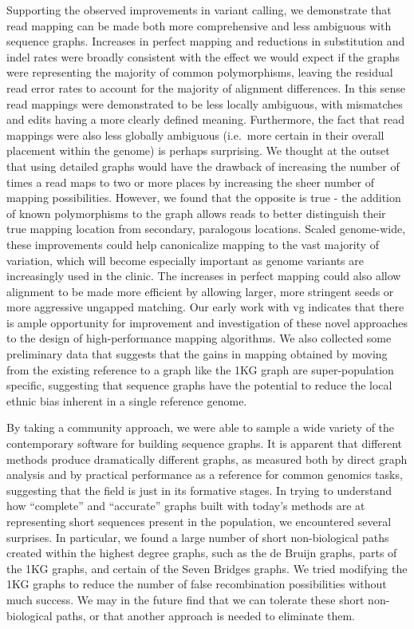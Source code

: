 Supporting the observed improvements in variant calling, we demonstrate
that read mapping can be made both more comprehensive and less ambiguous
with sequence graphs. Increases in perfect mapping and reductions in
substitution and indel rates were broadly consistent with the effect we
would expect if the graphs were representing the majority of common
polymorphisms, leaving the residual read error rates to account for the
majority of alignment differences. In this sense read mappings were
demonstrated to be less locally ambiguous, with mismatches and edits
having a more clearly defined meaning. Furthermore, the fact that read
mappings were also less globally ambiguous (i.e.~more certain in their
overall placement within the genome) is perhaps surprising. We thought
at the outset that using detailed graphs would have the drawback of
increasing the number of times a read maps to two or more places by
increasing the sheer number of mapping possibilities. However, we found
that the opposite is true - the addition of known polymorphisms to the
graph allows reads to better distinguish their true mapping location
from secondary, paralogous locations. Scaled genome-wide, these
improvements could help canonicalize mapping to the vast majority of
variation, which will become especially important as genome variants are
increasingly used in the clinic. The increases in perfect mapping could
also allow alignment to be made more efficient by allowing larger, more
stringent seeds or more aggressive ungapped matching. Our early work
with vg indicates that there is ample opportunity for improvement and
investigation of these novel approaches to the design of
high-performance mapping algorithms. We also collected some preliminary
data that suggests that the gains in mapping obtained by moving from the
existing reference to a graph like the 1KG graph are super-population
specific, suggesting that sequence graphs have the potential to reduce
the local ethnic bias inherent in a single reference genome.

By taking a community approach, we were able to sample a wide variety of
the contemporary software for building sequence graphs. It is apparent
that different methods produce dramatically different graphs, as
measured both by direct graph analysis and by practical performance as a
reference for common genomics tasks, suggesting that the field is just
in its formative stages. In trying to understand how ``complete'' and
``accurate'' graphs built with today's methods are at representing short
sequences present in the population, we encountered several surprises.
In particular, we found a large number of short non-biological paths
created within the highest degree graphs, such as the de Bruijn graphs,
parts of the 1KG graphs, and certain of the Seven Bridges graphs. We
tried modifying the 1KG graphs to reduce the number of false
recombination possibilities without much success. We may in the future
find that we can tolerate these short non-biological paths, or that
another approach is needed to eliminate them.

